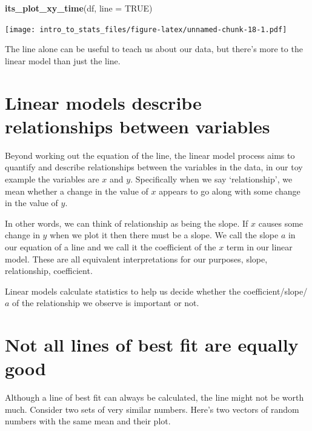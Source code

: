 \documentclass[
]{book}
\newenvironment{Shaded}{\begin{snugshade}}{\end{snugshade}}
\newcommand{\DataTypeTok}[1]{\textcolor[rgb]{0.13,0.29,0.53}{#1}}
\newcommand{\KeywordTok}[1]{\textcolor[rgb]{0.13,0.29,0.53}{\textbf{#1}}}
\newcommand{\NormalTok}[1]{#1}
\newcommand{\OtherTok}[1]{\textcolor[rgb]{0.56,0.35,0.01}{#1}}
\begin{document}
\begin{Shaded}
\begin{Highlighting}[]
\KeywordTok{its_plot_xy_time}\NormalTok{(df, }\DataTypeTok{line =} \OtherTok{TRUE}\NormalTok{)}
\end{Highlighting}
\end{Shaded}

\texttt{[image: intro\_to\_stats\_files/figure-latex/unnamed-chunk-18-1.pdf]}

The line alone can be useful to teach us about our data, but there's more to the linear model than just the line.

\hypertarget{linear-models-describe-relationships-between-variables}{%
\section{Linear models describe relationships between variables}\label{linear-models-describe-relationships-between-variables}}

Beyond working out the equation of the line, the linear model process aims to quantify and describe relationships between the variables in the data, in our toy example the variables are \(x\) and \(y\). Specifically when we say `relationship', we mean whether a change in the value of \(x\) appears to go along with some change in the value of \(y\).

In other words, we can think of relationship as being the slope. If \(x\) causes some change in \(y\) when we plot it then there must be a slope. We call the slope \(a\) in our equation of a line and we call it the coefficient of the \(x\) term in our linear model. These are all equivalent interpretations for our purposes, slope, relationship, coefficient.

Linear models calculate statistics to help us decide whether the coefficient/slope/\(a\) of the relationship we observe is important or not.

\hypertarget{not-all-lines-of-best-fit-are-equally-good}{%
\section{Not all lines of best fit are equally good}\label{not-all-lines-of-best-fit-are-equally-good}}

Although a line of best fit can always be calculated, the line might not be worth much. Consider two sets of very similar numbers. Here's two vectors of random numbers with the same mean and their plot.
\end{document}
